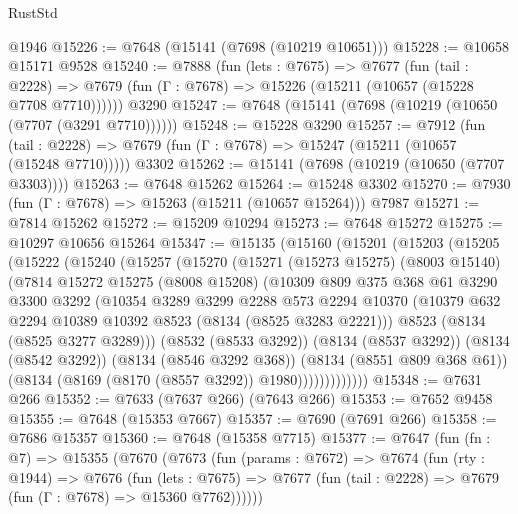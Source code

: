 \begin{lexlean}{RustStd}
\begin{coremodule}
{\begin{coremodule}
{{{{{{{{{{{{{{{{{{{{{{{{{{{{{{{{{{{{{{{{{{{{{{{{{{{{{    @1946
@15226 := @7648 (@15141 (@7698 (@10219 @10651)))
@15228 := @10658 @15171 @9528
@15240 := @7888
    (fun (lets : @7675) =>
    @7677
      (fun (tail : @2228) =>
      @7679 (fun (Γ : @7678) => @15226 (@15211 (@10657 (@15228 @7708 @7710))))))
    @3290
@15247 := @7648 (@15141 (@7698 (@10219 (@10650 (@7707 (@3291 @7710))))))
@15248 := @15228 @3290
@15257 := @7912
    (fun (tail : @2228) => @7679 (fun (Γ : @7678) => @15247 (@15211 (@10657 (@15248 @7710)))))
    @3302
@15262 := @15141 (@7698 (@10219 (@10650 (@7707 @3303))))
@15263 := @7648 @15262
@15264 := @15248 @3302
@15270 := @7930 (fun (Γ : @7678) => @15263 (@15211 (@10657 @15264))) @7987
@15271 := @7814 @15262
@15272 := @15209 @10294
@15273 := @7648 @15272
@15275 := @10297 @10656 @15264
@15347 := @15135
    (@15160
      (@15201
        (@15203
          (@15205
            (@15222
              (@15240
                (@15257
                  (@15270
                    (@15271
                      (@15273 @15275)
                      (@8003 @15140)
                      (@7814
                        @15272
                        @15275
                        (@8008 @15208)
                        (@10309
                          @809
                          @375
                          @368
                          @61
                          @3290
                          @3300
                          @3292
                          (@10354
                            @3289
                            @3299
                            @2288
                            @573
                            @2294
                            @10370
                            (@10379 @632 @2294 @10389 @10392 @8523 (@8134 (@8525 @3283 @2221)))
                            @8523
                            (@8134 (@8525 @3277 @3289)))
                          (@8532 (@8533 @3292))
                          (@8134 (@8537 @3292))
                          (@8134 (@8542 @3292))
                          (@8134 (@8546 @3292 @368))
                          (@8134 (@8551 @809 @368 @61))
                          (@8134 (@8169 (@8170 (@8557 @3292)) @1980)))))))))))))
@15348 := @7631 @266
@15352 := @7633 (@7637 @266) (@7643 @266)
@15353 := @7652 @9458
@15355 := @7648 (@15353 @7667)
@15357 := @7690 (@7691 @266)
@15358 := @7686 @15357
@15360 := @7648 (@15358 @7715)
@15377 := @7647
    (fun (fn : @7) =>
    @15355
      (@7670
        (@7673
          (fun (params : @7672) =>
          @7674
            (fun (rty : @1944) =>
            @7676
              (fun (lets : @7675) =>
              @7677 (fun (tail : @2228) => @7679 (fun (Γ : @7678) => @15360 @7762))))))
}}}}}}}}}}}}}}}}}}}}}}}}}}}}}}}}}}}}}}}}}}}}}}}}}}}}}
\end{coremodule}}
\end{coremodule}
\end{lexlean}
